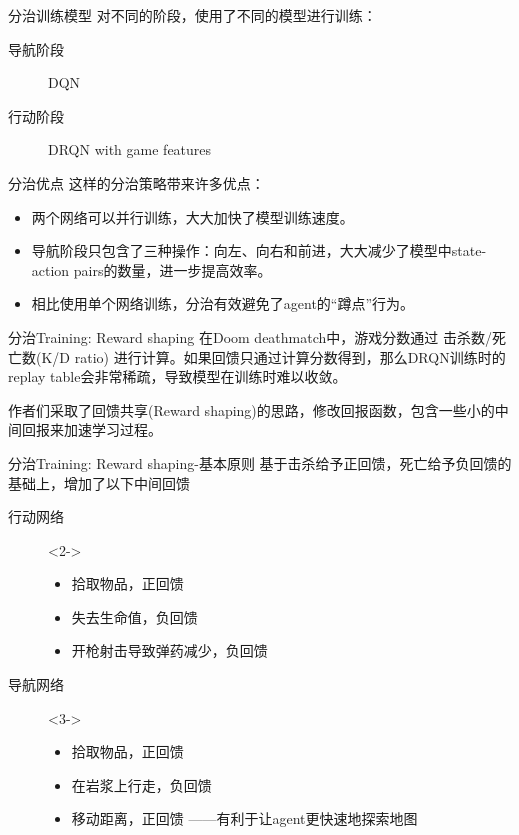 \documentclass[10pt]{beamer}
\begin{document}
	\begin{frame}{分治}{训练模型}
		对不同的阶段，使用了不同的模型进行训练：
		\begin{description}
			\item[导航阶段] DQN
			\item[行动阶段] DRQN with game features
		\end{description}
		
		
	\end{frame}

	\begin{frame}{分治}{优点}
		这样的分治策略带来许多优点：
		\begin{itemize}
			\item<2-> 两个网络可以并行训练，大大加快了模型训练速度。
			\item<3-> 导航阶段只包含了三种操作：向左、向右和前进，大大减少了模型中state-action pairs的数量，进一步提高效率。
			\item<4-> 相比使用单个网络训练，分治有效避免了agent的“蹲点”行为。
			
		\end{itemize}
	\end{frame}

	\begin{frame}{分治}{Training: Reward shaping}
		在Doom deathmatch中，游戏分数通过 击杀数/死亡数(K/D ratio) 进行计算。如果回馈只通过计算分数得到，那么DRQN训练时的replay table会非常稀疏，导致模型在训练时难以收敛。
		
		作者们采取了回馈共享(Reward shaping)的思路，修改回报函数，包含一些小的中间回报来加速学习过程。
		
	\end{frame}

	\begin{frame}{分治}{Training: Reward shaping-基本原则}
		基于击杀给予正回馈，死亡给予负回馈的基础上，增加了以下中间回馈
		\begin{description}
			\item[行动网络]<2->
				\begin{itemize}
					\item 拾取物品，正回馈
					\item 失去生命值，负回馈
					\item 开枪射击导致弹药减少，负回馈
				\end{itemize}
			\item [导航网络]<3->
				\begin{itemize}
					\item 拾取物品，正回馈
					\item 在岩浆上行走，负回馈
					\item 移动距离，正回馈  ——有利于让agent更快速地探索地图
				\end{itemize}
		\end{description}
	\end{frame}
\end{document}
